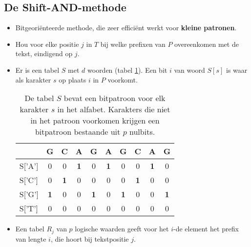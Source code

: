 \subsection{De Shift-AND-methode}
\begin{itemize}
    \item Bitgeoriënteerde methode, die zeer efficiënt werkt voor \textbf{kleine patronen}.
    \item Hou voor elke positie $j$ in $T$ bij welke prefixen van $P$ overeenkomen met de tekst, eindigend op $j$.
    \item Er is een tabel $S$ met $d$ woorden (tabel \ref{table:shiftandS}). Een bit $i$ van woord $S[s]$ is waar als karakter $s$ op plaats $i$ in $P$ voorkomt.
    \begin{table}[ht]
        \centering
        \begin{tabular}{l | c c c c c c c c c}
            & G & C & A & G & A & G & C & A & G \\
            \hline
            S['A'] & 0 & 0 & \textbf{1} & 0 & \textbf{1} & 0 & 0&\textbf{1} & 0 \\
            S['C'] & 0 & \textbf{1} & 0 & 0 & 0 & 0 & \textbf{1} & 0 & 0\\
            S['G'] & \textbf{1} & 0 & 0 & \textbf{1} & 0 & \textbf{1} & 0 & 0 & \textbf{1} \\
            S['T'] & 0 & 0 & 0 & 0 & 0 & 0 & 0 & 0& 0\\
        \end{tabular}
        \caption{De tabel $S$ bevat een bitpatroon voor elk karakter $s$ in het alfabet. Karakters die niet in het patroon voorkomen krijgen een bitpatroon bestaande uit $p$ nulbits.} 
        \label{table:shiftandS}
    \end{table}
    \item Een tabel $R_j$ van $p$ logische waarden geeft voor het $i$-de element het prefix van lengte $i$, die hoort bij tekstpositie $j$.

    \begin{table}[ht]
        \centering
        \scalebox{0.6}{
        
}
\end{table}
\end{itemize}
